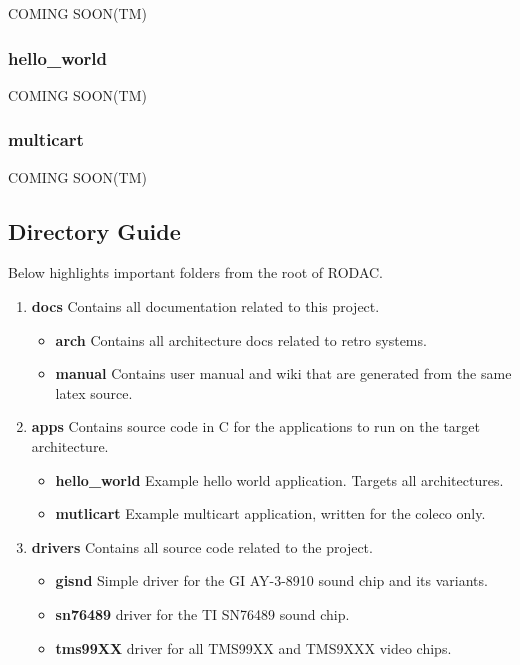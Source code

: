\documentclass{article}
\begin{document}
  \par
  COMING SOON(TM)

  \subsubsection{hello\_world}

  \par
  COMING SOON(TM)

  \subsubsection{multicart}

  \par
  COMING SOON(TM)

  \subsection{Directory Guide}

  \par
  Below highlights important folders from the root of RODAC.

  \begin{enumerate}
    \item \textbf{docs} Contains all documentation related to this project.
      \begin{itemize}
        \item \textbf{arch} Contains all architecture docs related to retro systems.
        \item \textbf{manual} Contains user manual and wiki that are generated from the same latex source.
      \end{itemize}
    \item \textbf{apps} Contains source code in C for the applications to run on the target architecture.
      \begin{itemize}
        \item \textbf{hello\_world} Example hello world application. Targets all architectures.
        \item \textbf{mutlicart} Example multicart application, written for the coleco only.
      \end{itemize}
    \item \textbf{drivers} Contains all source code related to the project.
      \begin{itemize}
        \item \textbf{gisnd} Simple driver for the GI AY-3-8910 sound chip and its variants.
        \item \textbf{sn76489} driver for the TI SN76489 sound chip.
        \item \textbf{tms99XX} driver for all TMS99XX and TMS9XXX video chips.
      \end{itemize}
  \end{enumerate}
\end{document}

